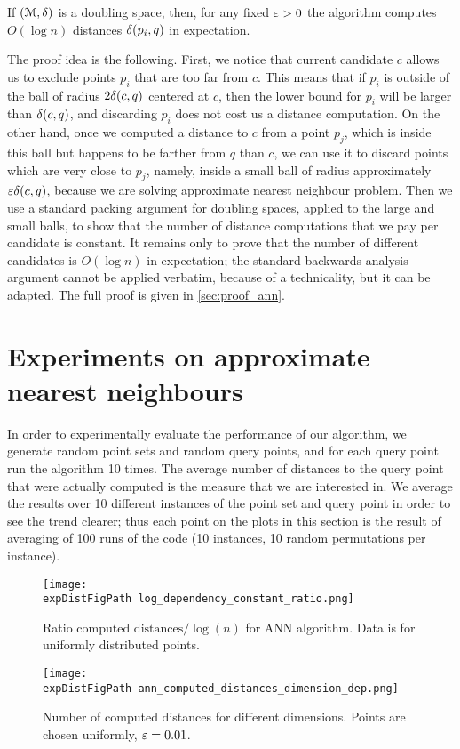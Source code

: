 \begin{theorem}
\label{thm:ann_bound}
    If $(\mathcal{M}, \delta)$ is a doubling space, then, for any fixed $\varepsilon > 0$ the
    algorithm computes $O(\log n)$ distances $\delta(p_i, q)$ in expectation.
\end{theorem}

The proof idea is the following. First, we notice
that current candidate $c$ allows us to exclude points
$p_i$ that are too far from $c$. This means that if $p_i$ is
outside of the ball of radius $2\delta(c, q)$ centered at $c$, then the lower
bound for $p_i$ will be larger than $\delta(c, q)$,
and discarding $p_i$ does not cost us a distance computation.
On the other hand, once we computed a distance to $c$
from a point $p_j$, which is inside this ball but happens to be farther from $q$ than $c$,
we can use it to discard points which are very close to $p_j$, 
namely, inside a small ball of radius approximately $\varepsilon \delta(c, q)$, because we
are solving approximate nearest neighbour problem.
Then we use a standard packing argument for doubling spaces, applied to the large and small balls, to show
that the number of distance computations that we pay per candidate is constant.
It remains only to prove that the number of different candidates is $O(\log n)$
in expectation; the standard
backwards analysis argument cannot be applied verbatim, because of a technicality,
but it can be adapted.
The full proof is given in \cref{sec:proof_ann}.

\section{Experiments on approximate nearest neighbours}
\label{sec:experiment_ann}

In order to experimentally evaluate the performance of our algorithm,
we generate random point sets and random query points, and for each query point
run the algorithm 10 times. The average number of distances to the query point
that were actually computed is the measure that we are interested in.
We average the results over 10 different instances of the point
set and query point in order to see the trend clearer; thus
each point on the plots in this section is the result of averaging of 100 runs
of the code (10 instances, 10 random permutations per instance).

\begin{figure}[ht]
    \begin{minipage}{0.45\textwidth}
        \texttt{[image: \\expDistFigPath log\_dependency\_constant\_ratio.png]}
        \caption{Ratio $\mbox{computed distances} / \log(n)$ for ANN algorithm. Data is for uniformly distributed
        points.}
        \label{fig:ann_const_ratio}
    \end{minipage}
    \begin{minipage}{0.45\textwidth}
        \texttt{[image: \\expDistFigPath ann\_computed\_distances\_dimension\_dep.png]}
        \caption{Number of computed distances for different dimensions. Points are chosen uniformly, $\varepsilon = 0.01$.}
        \label{fig:ann_dimension_dependence}
    \end{minipage}
\end{figure}


